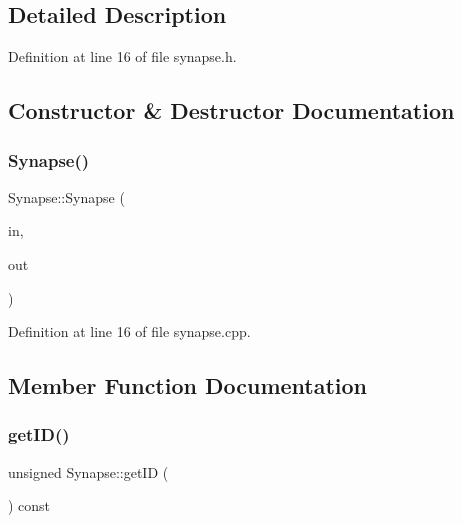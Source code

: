 \subsection{Detailed Description}


Definition at line 16 of file synapse.\+h.



\subsection{Constructor \& Destructor Documentation}
\mbox{\label{class_synapse_ad7d17e64c370f530debc6755ff39c866}} 
\subsubsection{\texorpdfstring{Synapse()}{Synapse()}}
{\footnotesize\ttfamily Synapse\+::\+Synapse (\begin{DoxyParamCaption}\item[{\hyperlink{neural_network_8h_af4884b0194f2598e689c894b76d0d92c}{Neuron\+Ptr}}]{in,  }\item[{\hyperlink{neural_network_8h_af4884b0194f2598e689c894b76d0d92c}{Neuron\+Ptr}}]{out }\end{DoxyParamCaption})}



Definition at line 16 of file synapse.\+cpp.



\subsection{Member Function Documentation}
\mbox{\label{class_synapse_a82879d96c983b1a788c69f8144bd3095}} 
\subsubsection{\texorpdfstring{get\+I\+D()}{getID()}}
{\footnotesize\ttfamily unsigned Synapse\+::get\+ID (\begin{DoxyParamCaption}{ }\end{DoxyParamCaption}) const\hspace{0.3cm}{\ttfamily [inline]}}



